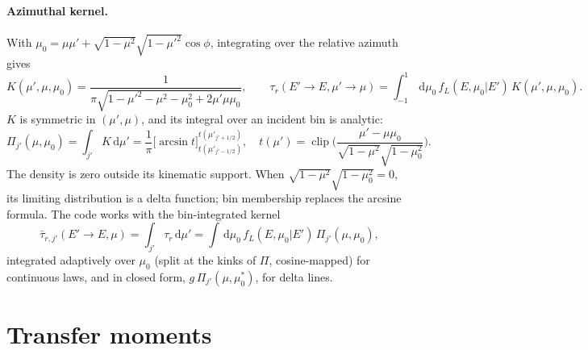 \documentclass[11pt]{article}
\newcommand{\dd}{\,\mathrm{d}}
\begin{document}
\paragraph{Azimuthal kernel.} With $\mu_0=\mu\mu'+\sqrt{1-\mu^2}\sqrt{1-\mu'^2}\cos\phi$,
integrating over the relative azimuth gives
\begin{equation}
  K(\mu',\mu,\mu_0)=\frac{1}{\pi\sqrt{1-\mu'^2-\mu^2-\mu_0^2+2\mu'\mu\mu_0}},
  \qquad
  \tau_r(E'\!\to E,\mu'\!\to\mu)=\int_{-1}^{1}\!\dd\mu_0\,f_L(E,\mu_0|E')\,K(\mu',\mu,\mu_0).
\end{equation}
$K$ is symmetric in $(\mu',\mu)$, and its integral over an incident bin is analytic:
\begin{equation}
  \Pi_{j'}(\mu,\mu_0)=\int_{j'}K\dd\mu'
  =\frac1\pi\Big[\arcsin t\Big]_{t(\mu'_{j'-1/2})}^{t(\mu'_{j'+1/2})},\quad
  t(\mu')=\operatorname{clip}\!\Big(\frac{\mu'-\mu\mu_0}{\sqrt{1-\mu^2}\sqrt{1-\mu_0^2}}\Big).
\end{equation}
The density is zero outside its kinematic support. When
$\sqrt{1-\mu^2}\sqrt{1-\mu_0^2}=0$, its limiting distribution is a delta function;
bin membership replaces the arcsine formula. The code works with the bin-integrated kernel
\begin{equation}
  \bar\tau_{r,j'}(E'\!\to E,\mu)=\int_{j'}\tau_r\dd\mu'=\int\dd\mu_0\,f_L(E,\mu_0|E')\,\Pi_{j'}(\mu,\mu_0),
\end{equation}
integrated adaptively over $\mu_0$ (split at the kinks of $\Pi$, cosine-mapped) for
continuous laws, and in closed form, $g\,\Pi_{j'}(\mu,\mu_0^*)$, for delta lines.

\section{Transfer moments}
\end{document}
